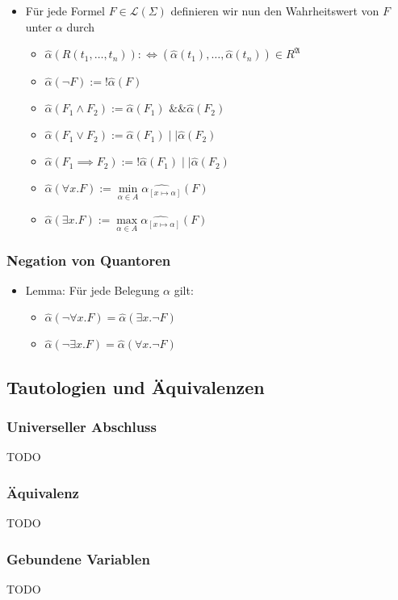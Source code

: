 \documentclass{scrartcl}
\begin{document}
\begin{itemize}
	\item Für jede Formel $F \in \mathcal{L}(\Sigma)$ definieren wir nun den Wahrheitswert von $F$ unter $\alpha$ durch
	\begin{itemize}
		\item $\widehat{\alpha}(R(t_1, \ldots, t_n)) :\iff (\widehat{\alpha}(t_1), \ldots, \widehat{\alpha}(t_n)) \in R^\mathfrak{A}$
		\item $\widehat{\alpha}(\neg F) := ! \widehat{\alpha}(F)$
		\item $\widehat{\alpha}(F_1 \wedge F_2) := \widehat{\alpha}(F_1) \text{ \&\& } \widehat{\alpha}(F_2)$
		\item $\widehat{\alpha}(F_1 \vee F_2) := \widehat{\alpha}(F_1) \mid \mid \widehat{\alpha}(F_2)$
		\item $\widehat{\alpha}(F_1 \implies F_2) := ! \widehat{\alpha}(F_1) \mid \mid \widehat{\alpha}(F_2)$
		\item $\widehat{\alpha}(\forall x.F) := \min \limits_{\alpha \in A} \widehat{\alpha_{[x \mapsto \alpha]}}(F)$
		\item $\widehat{\alpha}(\exists x.F) := \max \limits_{\alpha \in A} \widehat{\alpha_{[x \mapsto \alpha]}}(F)$
	\end{itemize}
\end{itemize}

\subsubsection{Negation von Quantoren}

\begin{itemize}
	\item Lemma: Für jede Belegung $\alpha$ gilt:
	\begin{itemize}
		\item $\widehat{\alpha}(\neg \forall x.F) = \widehat{\alpha}(\exists x. \neg F)$
		\item $\widehat{\alpha}(\neg \exists x.F) = \widehat{\alpha}(\forall x. \neg F)$
	\end{itemize}
\end{itemize}

\subsection{Tautologien und Äquivalenzen}

\subsubsection{Universeller Abschluss}

TODO

\subsubsection{Äquivalenz}

TODO

\subsubsection{Gebundene Variablen}

TODO
\end{document}
